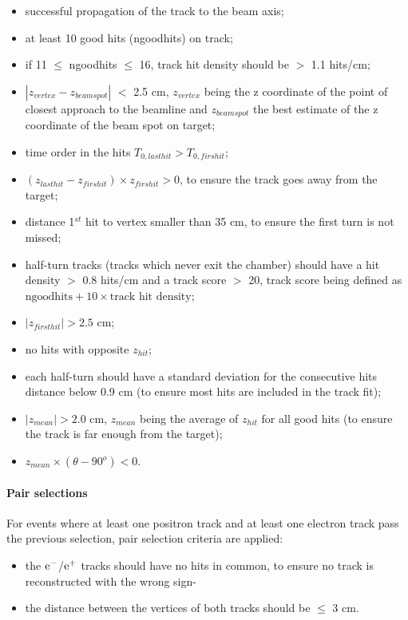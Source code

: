 \begin{refsection}
        \begin{itemize}
            \item successful propagation of the track to the beam axis;
            \item at least 10 good hits (ngoodhits) on track;
            \item if 11 $\leq$ ngoodhits $\leq$ 16, track hit density should be $>$ 1.1 hits/cm;   
            \item $|z_{vertex}-z_{beamspot}|$ $<$ 2.5 cm, $z_{vertex}$ being the z coordinate of the point of closest approach to the beamline and $z_{beamspot}$ the best estimate of the z coordinate of the beam spot on target;
            \item  time order in the hits $T_{0,lasthit}>T_{0,firshit}$;
            \item  $(z_{lasthit}-z_{firshit}) \times z_{firshit} > 0$, to ensure the track goes away from the target;
            \item distance 1$^{st}$ hit to vertex smaller than 35 cm, to ensure the first turn is not missed;
            \item half-turn tracks (tracks which never exit the chamber) should have a hit density $>$ 0.8 hits/cm and a track score $>$ 20, track score being defined as $\mbox{ngoodhits} + 10 \times \mbox{track hit density}$;
            \item  $|z_{firsthit}|>2.5$ cm;
            \item no hits with opposite $z_{hit}$;
            \item each half-turn should have a standard deviation for the consecutive hits distance below 0.9 cm (to ensure most hits are included in the track fit);
            \item $|z_{mean}|>2.0$ cm, $z_{mean}$ being the average of $z_{hit}$ for all good hits (to ensure the track is far enough from the target);
            \item $z_{mean} \times (\theta - 90^o) < 0$.
        \end{itemize}

        \paragraph{Pair selections}
        For events where at least one positron track and at least one electron track pass the previous selection, pair selection criteria are applied:
        \begin{itemize}
            \item the $\text{e}^-$/$\text{e}^+$ tracks should have no hits in common, to ensure no track is reconstructed with the wrong sign-
            \item the distance between the vertices of both tracks should be $\leq$ 3 cm.
        \end{itemize}



\end{refsection}
